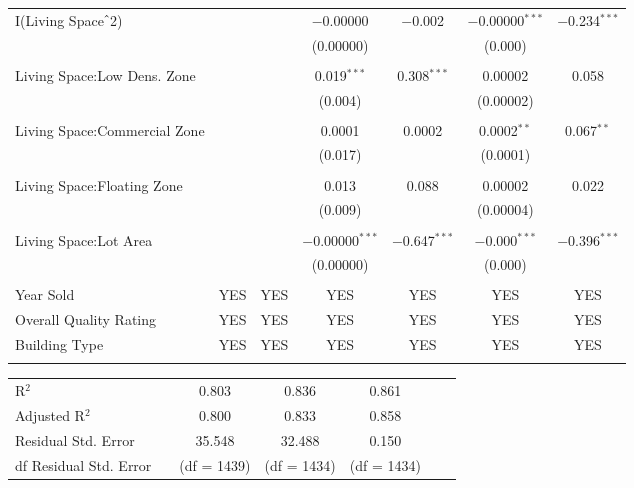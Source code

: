 \documentclass[a4paper]{article}
\begin{document}
\begin{table}[!htbp]
\begin{adjustwidth}{0.cm}{-0cm}
\begin{threeparttable}
\begin{tabular}{@{\extracolsep{-2pt}}lcccccc}
 I(Living Space$\hat{\mkern6mu}$2) &  &  & $-$0.00000 & $-$0.002 & $-$0.00000$^{***}$ & $-$0.234$^{***}$ \\ 
  &  &  & (0.00000) &  & (0.000) &  \\ 
  & & & & & & \\ 
 Living Space:Low Dens. Zone &  &  & 0.019$^{***}$ & 0.308$^{***}$ & 0.00002 & 0.058 \\ 
  &  &  & (0.004) & & (0.00002) &  \\ 
  & & & & & & \\ 
 Living Space:Commercial Zone &  &  & 0.0001 & 0.0002 & 0.0002$^{**}$ & 0.067$^{**}$ \\ 
  &  &  & (0.017) & & (0.0001) & \\ 
  & & & & & & \\ 
 Living Space:Floating Zone &  &  & 0.013 & 0.088 & 0.00002 & 0.022 \\ 
  &  &  & (0.009) &  & (0.00004) & \\ 
  & & & & & & \\ 
 Living Space:Lot Area &  &  & $-$0.00000$^{***}$ & $-$0.647$^{***}$ & $-$0.000$^{***}$ & $-$0.396$^{***}$ \\ 
  &  &  & (0.00000) &  & (0.000) &  \\ 
  & & & & & & \\ 
  Year Sold & YES & YES & YES & YES & YES & YES \\ 
  Overall Quality Rating & YES & YES & YES & YES & YES & YES \\  
  Building Type & YES & YES & YES & YES & YES & YES \\ 
\hline \\[-1.8ex]  
\end{tabular} 
\small 
\centering
\begin{tabular}{@{\extracolsep{25pt}}lcccccc} 
R$^{2}$ && 0.803 &   0.836 &  0.861   \\ 
Adjusted R$^{2}$ && 0.800 &  0.833 &   0.858  \\ 
Residual Std. Error && 35.548  & 32.488  & 0.150   \\ 
df Residual Std. Error && (df = 1439)  & (df = 1434) & (df = 1434)\\

\end{tabular}
\end{threeparttable}
\end{adjustwidth}
\end{table}
\end{document}

